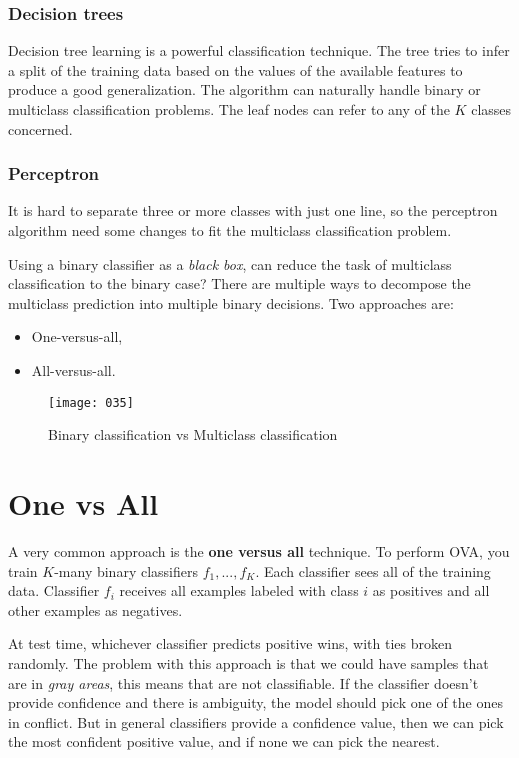 \subsubsection{Decision trees}
Decision tree learning is a powerful classification technique. The tree tries to infer a split of the training data based on the values of the available features to produce a good generalization. The algorithm can naturally handle binary or multiclass classification problems. The leaf nodes can refer to any of the \(K\) classes concerned.

\subsubsection{Perceptron}
It is hard to separate three or more classes with just one line, so the perceptron algorithm need some changes to fit the multiclass classification problem.

Using a binary classifier as a \emph{black box}, can reduce the task of multiclass classification to the binary case? There are multiple ways to decompose the multiclass prediction into multiple binary decisions. Two approaches are:
\begin{itemize}
    \item One-versus-all,
    \item All-versus-all.
\end{itemize}

\begin{figure}[t]
\begin{center}
    \texttt{[image: 035]}
	\vspace*{-35pt}
\end{center}
\caption{Binary classification vs Multiclass classification}
\label{fig:035}
\end{figure}

\section{One vs All}
A very common approach is the \textbf{one versus all} technique. To perform OVA, you train \(K\)-many binary classifiers \(f_1,...,f_K\). Each classifier sees all of the training data. Classifier \(f_i\) receives all examples labeled with class \(i\) as positives and all other examples as negatives.

At test time, whichever classifier predicts positive wins, with ties broken randomly. The problem with this approach is that we could have samples that are in \emph{gray areas}, this means that are not classifiable. If the classifier doesn't provide confidence and there is ambiguity, the model should pick one of the ones in conflict. But in general classifiers provide a confidence value, then we can pick the most confident positive value, and if none we can pick the nearest.

